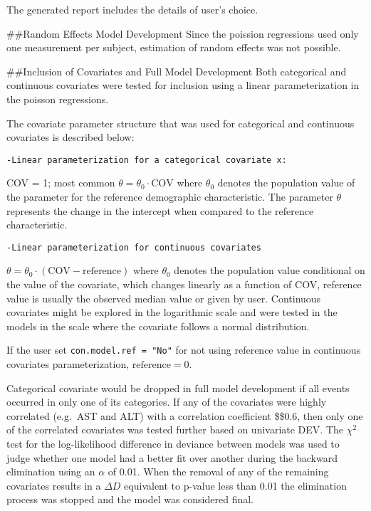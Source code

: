 \documentclass[
]{article}
\begin{document}
The generated report includes the details of user's choice.

\#\#Random Effects Model Development Since the poission regressions used
only one measurement per subject, estimation of random effects was not
possible.

\#\#Inclusion of Covariates and Full Model Development Both categorical
and continuous covariates were tested for inclusion using a linear
parameterization in the poisson regressions.

The covariate parameter structure that was used for categorical and
continuous covariates is described below:

\begin{verbatim}
-Linear parameterization for a categorical covariate x:
\end{verbatim}

\newline COV = 1; most common \newline
\(\theta=\theta_0 \cdot \text{COV}\) \newline where \(\theta_0\) denotes
the population value of the parameter for the reference demographic
characteristic. The parameter \(\theta\) represents the change in the
intercept when compared to the reference characteristic.

\begin{verbatim}
-Linear parameterization for continuous covariates
\end{verbatim}

\newline

\(\theta=\theta_0 \cdot (\text{COV}-\text{reference})\) \newline where
\(\theta_0\) denotes the population value conditional on the value of
the covariate, which changes linearly as a function of COV, reference
value is usually the observed median value or given by user. Continuous
covariates might be explored in the logarithmic scale and were tested in
the models in the scale where the covariate follows a normal
distribution.

If the user set \texttt{con.model.ref\ =\ "No"} for not using reference
value in continuous covariates parameterization,
\(\text{reference} = 0\).

Categorical covariate would be dropped in full model development if all
events occurred in only one of its categories. If any of the covariates
were highly correlated (e.g.~AST and ALT) with a correlation coefficient
\$\ge\$0.6, then only one of the correlated covariates was tested
further based on univariate DEV. The \(\chi^2\) test for the
log-likelihood difference in deviance between models was used to judge
whether one model had a better fit over another during the backward
elimination using an \(\alpha\) of 0.01. When the removal of any of the
remaining covariates results in a \(\Delta D\) equivalent to p-value
less than 0.01 the elimination process was stopped and the model was
considered final.
\end{document}
